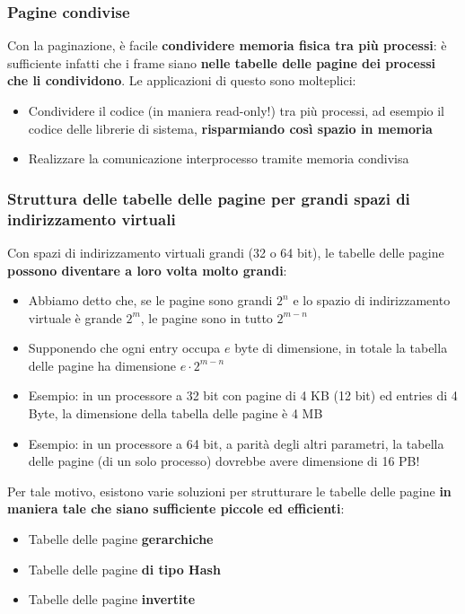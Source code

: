 \documentclass[12pt]{article}
\begin{document}
\subsubsection{Pagine condivise}
Con la paginazione, è facile \textbf{condividere memoria fisica tra più processi}: è sufficiente infatti che i frame siano \textbf{nelle tabelle delle pagine dei processi che li condividono}.
Le applicazioni di questo sono molteplici:
\begin{itemize}
    \item Condividere il codice (in maniera read-only!) tra più processi, ad esempio il codice delle librerie di sistema, \textbf{risparmiando così spazio in memoria}
    \item Realizzare la comunicazione interprocesso tramite memoria condivisa
\end{itemize}
\subsubsection{Struttura delle tabelle delle pagine per grandi spazi di indirizzamento virtuali}
Con spazi di indirizzamento virtuali grandi (32 o 64 bit), le tabelle delle pagine \textbf{possono diventare a loro volta molto grandi}:
\begin{itemize}
    \item Abbiamo detto che, se le pagine sono grandi $2^n$ e lo spazio di indirizzamento virtuale è grande $2^m$, le pagine sono in tutto $2^{m-n}$
    \item Supponendo che ogni entry occupa $e$ byte di dimensione, in totale la tabella delle pagine ha dimensione $e \cdot 2^{m-n}$
    \item Esempio: in un processore a 32 bit con pagine di 4 KB (12 bit) ed entries di 4 Byte, la dimensione della tabella delle pagine è 4 MB
    \item Esempio: in un processore a 64 bit, a parità degli altri parametri, la tabella delle pagine (di un solo processo) dovrebbe avere dimensione di 16 PB!
\end{itemize}
Per tale motivo, esistono varie soluzioni per strutturare le tabelle delle pagine \textbf{in maniera tale che siano sufficiente piccole ed efficienti}:
\begin{itemize}
    \item Tabelle delle pagine \textbf{gerarchiche}
    \item Tabelle delle pagine \textbf{di tipo Hash}
    \item Tabelle delle pagine \textbf{invertite}
\end{itemize}
\end{document}
